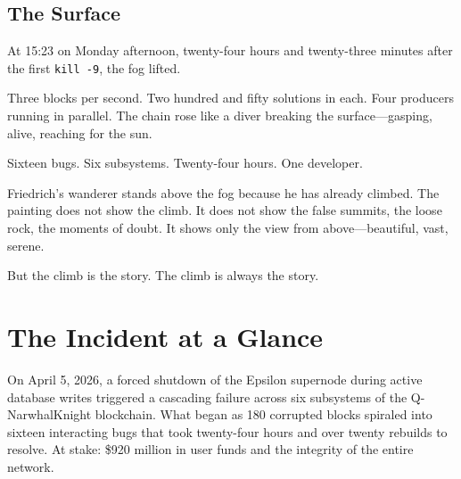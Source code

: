 \documentclass[11pt,a4paper]{article}
\begin{document}
\subsection*{The Surface}

At 15:23 on Monday afternoon, twenty-four hours and twenty-three minutes after the first \texttt{kill -9}, the fog lifted.

Three blocks per second. Two hundred and fifty solutions in each. Four producers running in parallel. The chain rose like a diver breaking the surface---gasping, alive, reaching for the sun.

Sixteen bugs. Six subsystems. Twenty-four hours. One developer.

Friedrich's wanderer stands above the fog because he has already climbed. The painting does not show the climb. It does not show the false summits, the loose rock, the moments of doubt. It shows only the view from above---beautiful, vast, serene.

But the climb is the story. The climb is always the story.

\newpage

\section{The Incident at a Glance}

\begin{storybox}
On April 5, 2026, a forced shutdown of the Epsilon supernode during active database writes triggered a cascading failure across six subsystems of the Q-NarwhalKnight blockchain. What began as 180 corrupted blocks spiraled into sixteen interacting bugs that took twenty-four hours and over twenty rebuilds to resolve. At stake: \$920 million in user funds and the integrity of the entire network.
\end{storybox}

\vspace{1em}
\end{document}
